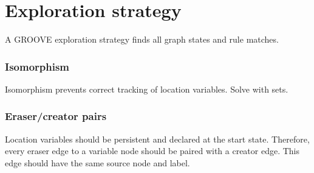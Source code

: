 \section{Exploration strategy}

A GROOVE exploration strategy finds all graph states and rule matches.

\subsubsection{Isomorphism}
Isomorphism prevents correct tracking of location variables. Solve with sets.

\subsubsection{Eraser/creator pairs}
Location variables should be persistent and declared at the start state. Therefore, every eraser edge to a variable node should be paired with a creator edge. This edge should have the same source node and label.
